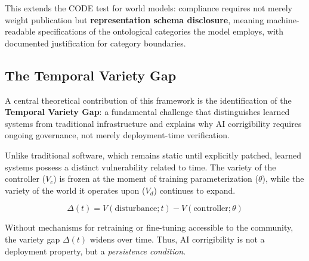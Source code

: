 \documentclass{article}
\begin{document}
This extends the CODE test for world models: compliance requires not merely weight publication but \textbf{representation schema disclosure}, meaning machine-readable specifications of the ontological categories the model employs, with documented justification for category boundaries.

\subsection{The Temporal Variety Gap}
\label{subsec:temporal-gap}

A central theoretical contribution of this framework is the identification of the \textbf{Temporal Variety Gap}: a fundamental challenge that distinguishes learned systems from traditional infrastructure and explains why AI corrigibility requires ongoing governance, not merely deployment-time verification.

Unlike traditional software, which remains static until explicitly patched, learned systems possess a distinct vulnerability related to time. The variety of the controller ($V_c$) is frozen at the moment of training parameterization ($\theta$), while the variety of the world it operates upon ($V_d$) continues to expand.

\begin{equation}
\Delta(t) = V(\text{disturbance}; t) - V(\text{controller}; \theta)
\end{equation}

Without mechanisms for retraining or fine-tuning accessible to the community, the variety gap $\Delta(t)$ widens over time. Thus, AI corrigibility is not a deployment property, but a \textit{persistence condition}.
\end{document}
